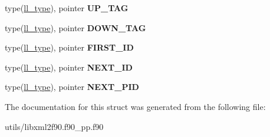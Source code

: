 \begin{DoxyCompactItemize}
\item 
\hypertarget{structll__module_1_1ll__type_a8a04031e8076069f38d86ddef1425d19}{
type(\hyperlink{structll__module_1_1ll__type}{ll\_\-type}), pointer {\bfseries UP\_\-TAG}}
\label{structll__module_1_1ll__type_a8a04031e8076069f38d86ddef1425d19}

\item 
\hypertarget{structll__module_1_1ll__type_a0c7964dc7f40436ba3dc30c2924cfad5}{
type(\hyperlink{structll__module_1_1ll__type}{ll\_\-type}), pointer {\bfseries DOWN\_\-TAG}}
\label{structll__module_1_1ll__type_a0c7964dc7f40436ba3dc30c2924cfad5}

\item 
\hypertarget{structll__module_1_1ll__type_ac26fdff6857507fed709f381a7094bad}{
type(\hyperlink{structll__module_1_1ll__type}{ll\_\-type}), pointer {\bfseries FIRST\_\-ID}}
\label{structll__module_1_1ll__type_ac26fdff6857507fed709f381a7094bad}

\item 
\hypertarget{structll__module_1_1ll__type_a8b462185ac7ffff94e52389bcc8e2a73}{
type(\hyperlink{structll__module_1_1ll__type}{ll\_\-type}), pointer {\bfseries NEXT\_\-ID}}
\label{structll__module_1_1ll__type_a8b462185ac7ffff94e52389bcc8e2a73}

\item 
\hypertarget{structll__module_1_1ll__type_ad07bd413dd11be1de39331e8e90987fb}{
type(\hyperlink{structll__module_1_1ll__type}{ll\_\-type}), pointer {\bfseries NEXT\_\-PID}}
\label{structll__module_1_1ll__type_ad07bd413dd11be1de39331e8e90987fb}

\end{DoxyCompactItemize}


The documentation for this struct was generated from the following file:\begin{DoxyCompactItemize}
\item 
utils/libxml2f90.f90\_\-pp.f90\end{DoxyCompactItemize}
